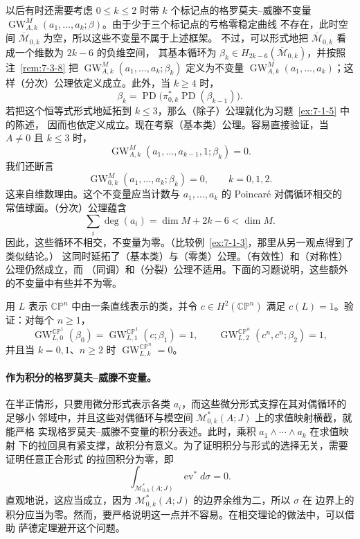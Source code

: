 \begin{remark}\label{rem:7-5-2}
以后有时还需要考虑 $0\le k\le2$ 时带 $k$ 个标记点的格罗莫夫--威滕不变量
$\operatorname{GW}_{A,k}^M(a_1,\ldots,a_k;\beta)$。由于少于三个标记点的亏格零稳定曲线
不存在，此时空间 $\overline{\mathcal M}_{0,k}$ 为空，所以这些不变量不属于上述框架。
不过，可以形式地把 $\overline{\mathcal M}_{0,k}$ 看成一个维数为 $2k-6$ 的负维空间，
其基本循环为
$\beta_k\in H_{2k-6}(\overline{\mathcal M}_{0,k})$，并按照注~\ref{rem:7-3-8} 把
$\operatorname{GW}_{A,k}^M(a_1,\ldots,a_k;\beta_k)$ 定义为不变量
$\operatorname{GW}_{A,k}^M(a_1,\ldots,a_k)$；这样（分次）公理依定义成立。此外，当
$k\ge4$ 时，
\[
  \beta_k=\operatorname{PD}
  \bigl(\pi_{0,k}^*\operatorname{PD}(\beta_{k-1})\bigr).
\]
若把这个恒等式形式地延拓到 $k\le3$，那么（除子）公理就化为习题~\ref{ex:7-1-5}
中的陈述，
因而也依定义成立。现在考察（基本类）公理。容易直接验证，当 $A\ne0$ 且 $k\le3$ 时，
\[
  \operatorname{GW}_{A,k}^M(a_1,\ldots,a_{k-1},1;\beta_k)=0.
\]
我们还断言
\[
  \operatorname{GW}_{0,k}^M(a_1,\ldots,a_k;\beta_k)=0,
  \qquad k=0,1,2.
\]
这来自维数理由。这个不变量应当计数与 $a_1,\ldots,a_k$ 的 Poincaré 对偶循环相交的
常值球面。（分次）公理蕴含
\[
  \sum_i\deg(a_i)=\dim M+2k-6<\dim M.
\]
因此，这些循环不相交，不变量为零。（比较例~\ref{ex:7-1-3}，那里从另一观点得到了类似结论。）
这同时延拓了（基本类）与（零类）公理。（有效性）和（对称性）公理仍然成立，而
（同调）和（分裂）公理不适用。下面的习题说明，这些额外的不变量中有些并不为零。
\end{remark}

\begin{exercise}\label{ex:7-5-3}
用 $L$ 表示 $\mathbb{CP}^n$ 中由一条直线表示的类，并令
$c\in H^2(\mathbb{CP}^n)$ 满足 $c(L)=1$。验证：对每个 $n\ge1$，
\[
  \operatorname{GW}_{L,0}^{\mathbb{CP}^1}(\beta_0)
  =\operatorname{GW}_{L,1}^{\mathbb{CP}^1}(c;\beta_1)=1,
  \qquad
  \operatorname{GW}_{L,2}^{\mathbb{CP}^n}(c^n,c^n;\beta_2)=1,
\]
并且当 $k=0,1$、$n\ge2$ 时
$\operatorname{GW}_{L,k}^{\mathbb{CP}^n}=0$。
\end{exercise}

\paragraph{作为积分的格罗莫夫--威滕不变量。}
在半正情形，只要用微分形式表示各类 $a_i$，而这些微分形式支撑在其对偶循环的足够小
邻域中，并且这些对偶循环与模空间 $\mathcal M^*_{0,k}(A;J)$ 上的求值映射横截，就能严格
实现格罗莫夫--威滕不变量的积分表述。此时，乘积 $a_1\wedge\cdots\wedge a_k$ 在求值映射
下的拉回具有紧支撑，故积分有意义。为了证明积分与形式的选择无关，需要证明任意正合形式
的拉回积分为零，即
\[
  \int_{\mathcal M^*_{0,k}(A;J)}\operatorname{ev}^*d\sigma=0.
\]
直观地说，这应当成立，因为 $\mathcal M^*_{0,k}(A;J)$ 的边界余维为二，所以 $\sigma$ 在
边界上的积分应当为零。然而，要严格说明这一点并不容易。在相交理论的做法中，可以借助
萨德定理避开这个问题。

